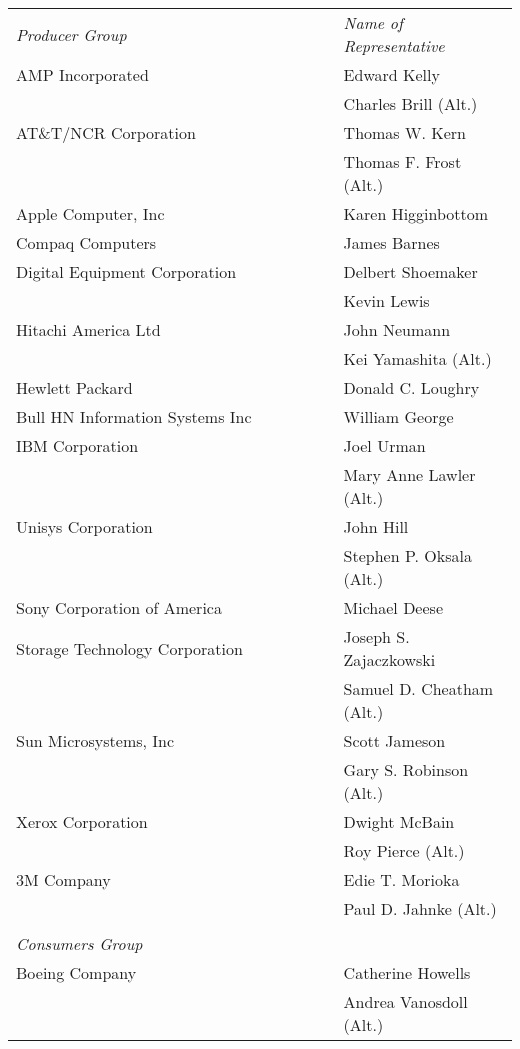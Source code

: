 \begin{supertabular}{p{0.65\linewidth}p{0.35\linewidth}}
\emph{Producer Group}			\dotfill& \emph{Name of Representative} \\
AMP Incorporated				\dotfill& Edward Kelly \\
										& Charles Brill (Alt.) \\
AT\&T/NCR Corporation			\dotfill& Thomas W. Kern \\
										& Thomas F. Frost (Alt.) \\
Apple Computer, Inc				\dotfill& Karen Higginbottom \\
Compaq Computers				\dotfill& James Barnes \\
Digital Equipment Corporation	\dotfill& Delbert Shoemaker \\
										& Kevin Lewis \\
Hitachi America Ltd				\dotfill& John Neumann \\
										& Kei Yamashita (Alt.) \\
Hewlett Packard					\dotfill& Donald C. Loughry \\
Bull HN Information Systems Inc	\dotfill& William George \\
IBM Corporation					\dotfill& Joel Urman \\
										& Mary Anne Lawler (Alt.) \\
Unisys Corporation				\dotfill& John Hill \\
										& Stephen P. Oksala (Alt.) \\
Sony Corporation of America		\dotfill& Michael Deese \\
Storage Technology Corporation	\dotfill& Joseph S. Zajaczkowski \\
										& Samuel D. Cheatham (Alt.) \\
Sun Microsystems, Inc			\dotfill& Scott Jameson \\
										& Gary S. Robinson (Alt.) \\
\footnotemark[1]
Xerox Corporation				\dotfill& Dwight McBain \\
										& Roy Pierce (Alt.) \\
3M Company						\dotfill& Edie T. Morioka \\
										& Paul D. Jahnke (Alt.) \\
\\
\emph{Consumers Group} \\
Boeing Company					\dotfill& Catherine Howells \\
										& Andrea Vanosdoll (Alt.) \\

\end{supertabular}
